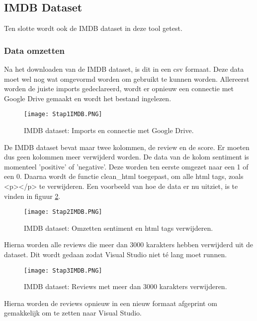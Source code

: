 \subsection{IMDB Dataset}
\label{imdbdatasetazure}
Ten slotte wordt ook de IMDB dataset in deze tool getest. 

\subsubsection{Data omzetten}
\label{imdbdatasetomzettenazure}
Na het downloaden van de IMDB dataset, is dit in een \gls{csv} formaat. Deze data moet wel nog wat omgevormd worden om gebruikt te kunnen worden. Allereerst worden de juiste imports gedeclareerd, wordt er opnieuw een connectie met Google Drive gemaakt en wordt het bestand ingelezen. 

\begin{figure}[!htbp]
    \texttt{[image: Stap1IMDB.PNG]}
    \caption{\label{stap1imdb}IMDB dataset: Imports en connectie met Google Drive.}
\end{figure}
\FloatBarrier 

De IMDB dataset bevat maar twee kolommen, de review en de score. Er moeten dus geen kolommen meer verwijderd worden. De data van de kolom sentiment is momenteel 'positive' of 'negative'. Deze worden ten eerste omgezet naar een 1 of een 0. Daarna wordt de functie clean\_html toegepast, om alle html tags, zoals <p></p> te verwijderen. Een voorbeeld van hoe de data er nu uitziet, is te vinden in figuur \ref{stap2imdb}.

\begin{figure}[!htbp]
    \texttt{[image: Stap2IMDB.PNG]}
    \caption{\label{stap2imdb}IMDB dataset: Omzetten sentiment en html tags verwijderen.}
\end{figure}
\FloatBarrier 

Hierna worden alle reviews die meer dan 3000 karakters hebben verwijderd uit de dataset. Dit wordt gedaan zodat Visual Studio niet té lang moet runnen. 

\begin{figure}[!htbp]
    \texttt{[image: Stap3IMDB.PNG]}
    \caption{\label{stap3imdb}IMDB dataset: Reviews met meer dan 3000 karakters verwijderen.}
\end{figure}
\FloatBarrier

Hierna worden de reviews opnieuw in een nieuw formaat afgeprint om gemakkelijk om te zetten naar Visual Studio.

